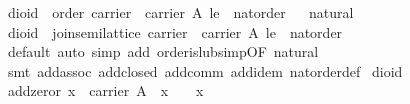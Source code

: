 \begin{isabellebody}
\endisatagproof
{\isafoldproof}%
%
\isadelimproof
\isanewline
%
\endisadelimproof
\isanewline
{}\isamarkupfalse%
\isanewline
\isanewline
{}\isamarkupfalse%
\ dioid\ {}\ order\ {}{}carrier\ {}\ carrier\ A{}\ le\ {}\ nat{}order{}{}%
\isadelimproof
\ %
\endisadelimproof
%
\isatagproof
{}\isamarkupfalse%
\ natural\ \isamarkupfalse%
%
\endisatagproof
{\isafoldproof}%
%
\isadelimproof
%
\endisadelimproof
\isanewline
\isanewline
{}\isamarkupfalse%
\ dioid\ {}\ join{}semilattice\ {}{}carrier\ {}\ carrier\ A{}\ le\ {}\ nat{}order{}{}\isanewline
%
\isadelimproof
\ \ %
\endisadelimproof
%
\isatagproof
{}\isamarkupfalse%
\ {}default{}\ auto\ simp\ add{}\ order{}is{}lub{}simp{}OF\ natural{}{}\isanewline
\ \ \isamarkupfalse%
\ {}smt\ add{}assoc\ add{}closed\ add{}comm\ add{}idem\ nat{}order{}def{}%
\endisatagproof
{\isafoldproof}%
%
\isadelimproof
\isanewline
%
\endisadelimproof
\isanewline
{}\isamarkupfalse%
\ dioid\isanewline
{}\isanewline
\isanewline
\ \ \isamarkupfalse%
\ add{}zeror{}\ {}x\ {}\ carrier\ A\ {}\ x\ {}\ {}\ {}\ x{}\isanewline

\end{isabellebody}
